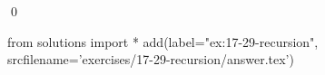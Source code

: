 
\begin{ex}
  \label{ex:17-29-recursion}
  
  \qed
\end{ex}
\begin{python0}
from solutions import *
add(label="ex:17-29-recursion",
    srcfilename='exercises/17-29-recursion/answer.tex')
\end{python0}
